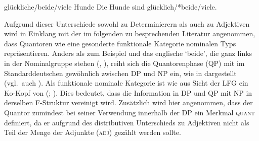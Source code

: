 \begin{exe}
\label{ex:beidedet}
\ex \begin{xlist}
		\label{ex:beidedet_1}
		\label{ex:beidedet_2}
		\label{ex:beidedet_3}
		\label{ex:beidedet_4}
\end{xlist}

\ex \begin{xlist}
	\ex glückliche/beide/viele Hunde
		\label{ex:beidepred_1}
	\ex Die Hunde sind glücklich/*beide/viele.
		\label{ex:beidepred_2}
\end{xlist}
\end{exe}

Aufgrund dieser Unterschiede sowohl zu  Determinierern als auch zu
Adjektiven wird in Einklang mit der im folgenden zu besprechenden Literatur
angenommen, dass Quantoren wie  eine gesonderte funktionale Kategorie
 nominalen Typs repräsentieren. Anders als zum Beispiel
 und das englische  `beide', die ganz links in der
Nominalgruppe stehen (, ), reiht sich die
Quantorenphase (QP) mit  im Standarddeutschen gewöhnlich zwischen DP
und NP ein, wie in  dargestellt (vgl.~auch \cite[44--45 mit
Anm.~30]{lyons1999}). Als funktionale nominale Kategorie ist  wie
 aus Sicht der LFG ein Ko-Kopf von  (;
\cite[124]{bresnanetal2016}). Dies bedeutet, dass die Information in DP und QP
mit NP in derselben F-Struktur vereinigt wird. Zusätzlich wird hier angenommen,
dass der Quantor zumindest bei seiner Verwendung innerhalb der DP ein Merkmal
\textsc{quant} definiert, da er aufgrund des distributiven Unterschieds zu
Adjektiven nicht als Teil der Menge der Adjunkte (\textsc{adj}) gezählt werden
sollte.


